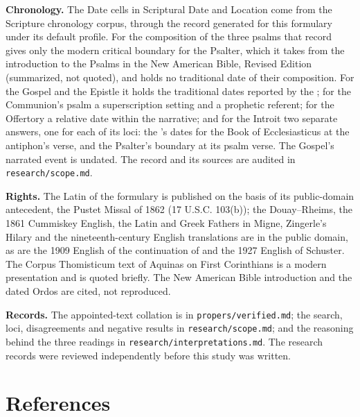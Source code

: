 {\textbf{Chronology.} The Date cells in Scriptural Date and Location come from
the Scripture chronology corpus, through the record generated for this
formulary under its default profile. For the composition of the three psalms
that record gives only the modern critical boundary for the Psalter, which it
takes from the introduction to the Psalms in the New American Bible, Revised
Edition (summarized, not quoted), and holds no traditional date of their
composition. For the Gospel
and the Epistle it holds the traditional dates reported by the ; for the Communion's psalm a superscription setting and a
prophetic referent; for the Offertory a relative date within the narrative;
and for the Introit two separate answers, one for each of its loci: the
's dates for the Book of Ecclesiasticus at the
antiphon's verse, and the Psalter's boundary at its psalm verse. The Gospel's
narrated event is undated.
The record and its sources are audited in \texttt{research/scope.md}.

\textbf{Rights.} The Latin of the formulary is published on the basis of its
public-domain antecedent, the Pustet Missal of 1862 (17 U.S.C. 103(b)); the
Douay--Rheims, the 1861 Cummiskey English, the Latin and Greek Fathers in Migne,
Zingerle's Hilary and the nineteenth-century English translations are in the
public domain, as are the 1909 English of the continuation of  and the 1927 English of Schuster. The Corpus Thomisticum text
of Aquinas on First Corinthians is a modern presentation and is quoted briefly. The New
American Bible introduction and the dated Ordos are cited, not reproduced.

\textbf{Records.} The appointed-text collation is in \texttt{propers/verified.md};
the search, loci, disagreements and negative results in
\texttt{research/scope.md}; and the reasoning behind the three readings in
\texttt{research/interpretations.md}. The research records were reviewed
independently before this study was written.
\par}

\section*{References}
\label{sec:references}

